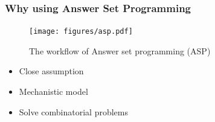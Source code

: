 \documentclass[8pt]{beamer}
\begin{document}
\begin{frame}
\frametitle{Why using Answer Set Programming}
\centering
\begin{figure}[h]
\texttt{[image: figures/asp.pdf]}
\caption{The workflow of Answer set programming (ASP) \tiny \citep{Kaufmann2016GroundingAS}}
\end{figure}
\begin{block}{}
\begin{itemize}
\item Close assumption
\item Mechanistic model
\item Solve combinatorial problems
\end{itemize}

\end{block}
\end{frame}
\end{document}
